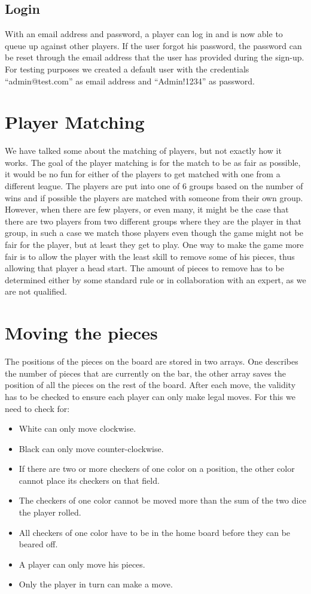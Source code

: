 \documentclass[ twoside,openright,titlepage,numbers=noenddot,headinclude,%
                footinclude=true,cleardoublepage=empty,abstractoff, %
                BCOR=5mm,paper=a4,fontsize=11pt,%
                ngerman,american,%
                ]{scrreprt}
\begin{document}
\subsection{Login}
With an email address and password, a player can log in and is now able to queue up against other players. If the user forgot his password, the password can be reset through the email address that the user has provided during the sign-up. \\
For testing purposes we created a default user with the credentials ``admin@test.com'' as email address and ``Admin!1234'' as password.

\section{Player Matching}
We have talked some about the matching of players, but not exactly how it works. The goal of the player matching is for the match to be as fair as possible, it would be no fun for either of the players to get matched with one from a different league. The players are put into one of 6 groups based on the number of wins and if possible the players are matched with someone from their own group. However, when there are few players, or even many, it might be the case that there are two players from two different groups where they are the player in that group, in such a case we match those players even though the game might not be fair for the player, but  at least they get to play. One way to make the game more fair is to allow the player with the least skill to remove some of his pieces, thus allowing that player a head start. The amount of pieces to remove has to be determined either by some standard rule or in collaboration with an expert, as we are not qualified.


\section{Moving the pieces}
The positions of the pieces on the board are stored in two arrays. One describes the number of pieces that are currently on the bar, the other array saves the position of all the pieces on the rest of the board. 
After each move, the validity has to be checked to ensure each player can only make legal moves. 
For this we need to check for:
\begin{itemize}
  \item White can only move clockwise.
  \item Black can only move counter-clockwise.
  \item If there are two or more checkers of one color on a position, the other color cannot place its checkers on that field. 
  \item The checkers of one color cannot be moved more than the sum of the two dice the player rolled.
  \item All checkers of one color have to be in the home board before they can be beared off. 
  \item A player can only move his pieces.
  \item Only the player in turn can make a move.
\end{itemize}
\end{document}
